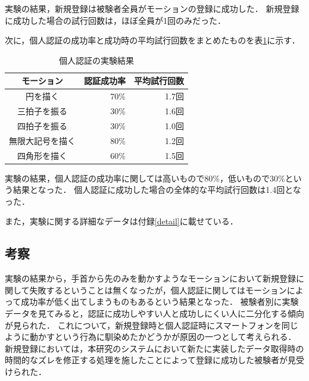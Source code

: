 \documentclass[12pt]{jreport}
\begin{document}
    実験の結果，新規登録は被験者全員がモーションの登録に成功した．
    新規登録に成功した場合の試行回数は，ほぼ全員が1回のみだった．

    次に，個人認証の成功率と成功時の平均試行回数をまとめたものを表\ref{authResult}に示す．

    \begin{table}[htb]
        \begin{center}
            \caption{個人認証の実験結果}
            \label{authResult}
            \begin{tabular}{|c|r|r|} \hline
                モーション & 認証成功率 & 平均試行回数 \\ \hline \hline
                円を描く & 70\% & 1.7回 \\ \hline
                三拍子を振る & 30\% & 1.6回 \\ \hline
                四拍子を振る & 30\% & 1.0回 \\ \hline
                無限大記号を描く & 80\% & 1.2回 \\ \hline
                四角形を描く & 60\% & 1.5回 \\ \hline
            \end{tabular}
        \end{center}
    \end{table}

    実験の結果，個人認証の成功率に関しては高いもので80\%，低いもので30\%という結果となった．
    個人認証に成功した場合の全体的な平均試行回数は1.4回となった．

    また，実験に関する詳細なデータは付録\ref{detail}に載せている．

    \subsection{考察} %
    実験の結果から，手首から先のみを動かすようなモーションにおいて新規登録に関して失敗するということは無くなったが，個人認証に関してはモーションによって成功率が低く出てしまうものもあるという結果となった．
    被験者別に実験データを見てみると，認証に成功しやすい人と成功しにくい人に二分化する傾向が見られた．
    これについて，新規登録時と個人認証時にスマートフォンを同じように動かすという行為に馴染めたかどうかが原因の一つとして考えられる．
    新規登録においては，本研究のシステムにおいて新たに実装したデータ取得時の時間的なズレを修正する処理を施したことによって登録に成功した被験者が見受けられた．
\end{document}
